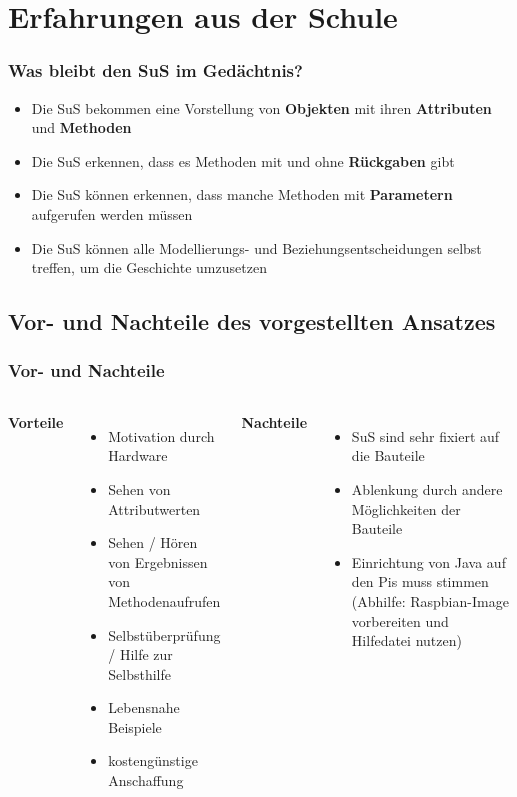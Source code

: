 \documentclass[usenames,dvipsnames]{beamer}
\begin{document}

\section{Erfahrungen aus der Schule}


\begin{frame}
\frametitle{Was bleibt den SuS im Gedächtnis?}
\begin{itemize}
\item Die SuS bekommen eine Vorstellung von \textbf{Objekten} mit ihren \textbf{Attributen} und \textbf{Methoden}
\item Die SuS erkennen, dass es Methoden mit und ohne \textbf{Rückgaben} gibt
\item Die SuS können erkennen, dass manche Methoden mit \textbf{Parametern} aufgerufen werden müssen
\item Die SuS können alle Modellierungs- und Beziehungsentscheidungen selbst treffen, um die Geschichte umzusetzen
\end{itemize}
\end{frame}


\subsection{Vor- und Nachteile des vorgestellten Ansatzes}


\begin{frame}
\frametitle{Vor- und Nachteile}

\begin{columns}[t]
\textbf{Vorteile}
\begin{itemize}
\item Motivation durch Hardware
\item Sehen von Attributwerten
\item Sehen / Hören von Ergebnissen von Methodenaufrufen
\item Selbstüberprüfung / Hilfe zur Selbsthilfe
\item Lebensnahe Beispiele
\item kostengünstige Anschaffung
\end{itemize}

\textbf{Nachteile}
\begin{itemize}
\item SuS sind sehr fixiert auf die Bauteile
\item Ablenkung durch andere Möglichkeiten der Bauteile
\item Einrichtung von Java auf den Pis muss stimmen (Abhilfe: Raspbian-Image vorbereiten und Hilfedatei nutzen)
\end{itemize}
\end{columns}
\end{frame}
\end{document}
